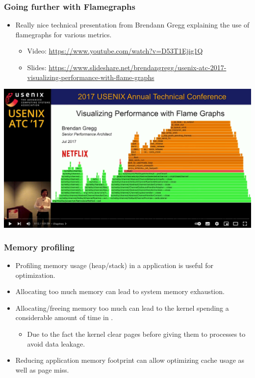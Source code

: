 \begin{frame}[fragile]
  \frametitle{Going further with Flamegraphs}
  \begin{itemize}
    \item Really nice technical presentation from Brendann Gregg explaining
          the use of flamegraphs for various metrics.
    \begin{itemize}
      \item Video: \url{https://www.youtube.com/watch?v=D53T1Ejig1Q}
      \item Slides: \url{https://www.slideshare.net/brendangregg/usenix-atc-2017-visualizing-performance-with-flame-graphs}
    \end{itemize}
  \end{itemize}
  \begin{center}
  \center\includegraphics[height=0.5\textheight]{slides/debugging-application-profiling/flamegraph_atc20.png}
  \end{center}
\end{frame}

\begin{frame}
  \frametitle{Memory profiling}
  \begin{itemize}
    \item Profiling memory usage (heap/stack) in a application is useful for
          optimization.
    \item Allocating too much memory can lead to system memory exhaustion.
    \item Allocating/freeing memory too much can lead to the kernel spending a
          considerable amount of time in .
    \begin{itemize}
      \item Due to the fact the kernel clear pages before giving them to
            processes to avoid data leakage.
    \end{itemize}
    \item Reducing application memory footprint can allow optimizing cache usage
          as well as page miss.
  \end{itemize}
\end{frame}

